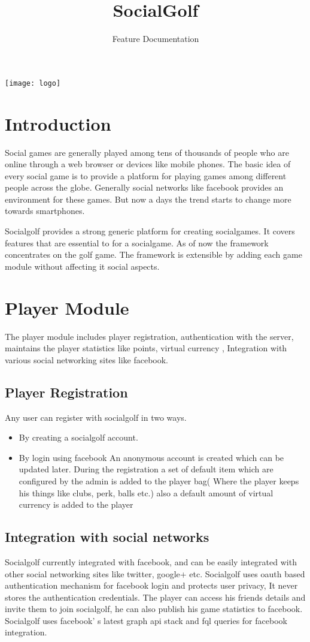 \documentclass[12pt]{article}
\title{SocialGolf}
\author{Feature Documentation}
\date{}
\begin{document}
\maketitle 
\begin{center} 
\texttt{[image: logo]}
\end{center}
\newpage
\tableofcontents
\newpage
\section{Introduction}
Social games are generally played among tens of thousands of people who are online through a web browser or devices like mobile phones. The basic idea of every social game is to provide a platform for playing games among different people across the globe. Generally social networks like facebook provides an environment for these games. But now a days the trend starts to change more towards smartphones. 

Socialgolf provides a strong generic platform for creating socialgames. It covers features that are essential  to for a socialgame. As of now the framework concentrates on the golf game. The framework is extensible by adding each game module without affecting it social aspects.

\section{Player Module}
The player module includes player registration, authentication with the server, maintains the player statistics like points, virtual currency , Integration with various social networking sites like facebook.
\subsection{Player Registration}
Any user can register with socialgolf in two ways.
\begin{itemize} 
\item By creating a socialgolf account.
\item By login using facebook
An anonymous account is created which can be updated later.
During the registration a set of default item which are configured by the admin is added to the player bag( Where the player keeps his things like clubs, perk, balls etc.) also a default amount of virtual currency is added to the player
\end{itemize}

\subsection{Integration with social networks}
Socialgolf currently integrated with facebook, and can be easily integrated with other social networking  sites like twitter, google+ etc. Socialgolf uses oauth based authentication mechanism for facebook login and protects user privacy, It never stores the authentication credentials.  The player can access his friends details and invite them to join socialgolf, he can also publish his game statistics to facebook. Socialgolf uses facebook’ s latest graph api stack and fql queries for facebook integration.
\end{document}
